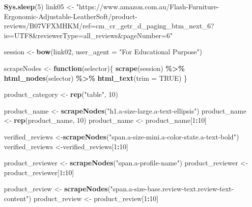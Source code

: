 \documentclass[
]{article}
\newenvironment{Shaded}{\begin{snugshade}}{\end{snugshade}}
\newcommand{\AttributeTok}[1]{\textcolor[rgb]{0.13,0.29,0.53}{#1}}
\newcommand{\ConstantTok}[1]{\textcolor[rgb]{0.56,0.35,0.01}{#1}}
\newcommand{\ControlFlowTok}[1]{\textcolor[rgb]{0.13,0.29,0.53}{\textbf{#1}}}
\newcommand{\DecValTok}[1]{\textcolor[rgb]{0.00,0.00,0.81}{#1}}
\newcommand{\FunctionTok}[1]{\textcolor[rgb]{0.13,0.29,0.53}{\textbf{#1}}}
\newcommand{\NormalTok}[1]{#1}
\newcommand{\OtherTok}[1]{\textcolor[rgb]{0.56,0.35,0.01}{#1}}
\newcommand{\SpecialCharTok}[1]{\textcolor[rgb]{0.81,0.36,0.00}{\textbf{#1}}}
\newcommand{\StringTok}[1]{\textcolor[rgb]{0.31,0.60,0.02}{#1}}
\begin{document}
\begin{Shaded}
\begin{Highlighting}[]
   \FunctionTok{Sys.sleep}\NormalTok{(}\DecValTok{5}\NormalTok{)}
\NormalTok{link05 }\OtherTok{\textless{}{-}} \StringTok{"https://www.amazon.com.au/Flash{-}Furniture{-}Ergonomic{-}Adjustable{-}LeatherSoft/product{-}reviews/B07VFXMHKM/ref=cm\_cr\_getr\_d\_paging\_btm\_next\_6?ie=UTF8\&reviewerType=all\_reviews\&pageNumber=6"}


\NormalTok{  session }\OtherTok{\textless{}{-}} \FunctionTok{bow}\NormalTok{(link02,}
               \AttributeTok{user\_agent =} \StringTok{"For Educational Purpose"}\NormalTok{)}

\NormalTok{  scrapeNodes }\OtherTok{\textless{}{-}} \ControlFlowTok{function}\NormalTok{(selector)\{}
    \FunctionTok{scrape}\NormalTok{(session) }\SpecialCharTok{\%\textgreater{}\%}
      \FunctionTok{html\_nodes}\NormalTok{(selector) }\SpecialCharTok{\%\textgreater{}\%}
      \FunctionTok{html\_text}\NormalTok{(}\AttributeTok{trim =} \ConstantTok{TRUE}\NormalTok{)}
\NormalTok{  \}}

\NormalTok{  product\_category }\OtherTok{\textless{}{-}} \FunctionTok{rep}\NormalTok{(}\StringTok{"table"}\NormalTok{, }\DecValTok{10}\NormalTok{)}

\NormalTok{  product\_name }\OtherTok{\textless{}{-}} \FunctionTok{scrapeNodes}\NormalTok{(}\StringTok{"h1.a{-}size{-}large.a{-}text{-}ellipsis"}\NormalTok{)}
\NormalTok{  product\_name }\OtherTok{\textless{}{-}} \FunctionTok{rep}\NormalTok{(product\_name, }\DecValTok{10}\NormalTok{)}
\NormalTok{  product\_name }\OtherTok{\textless{}{-}}\NormalTok{ product\_name[}\DecValTok{1}\SpecialCharTok{:}\DecValTok{10}\NormalTok{]}
  
\NormalTok{  verified\_reviews }\OtherTok{\textless{}{-}}\FunctionTok{scrapeNodes}\NormalTok{(}\StringTok{"span.a{-}size{-}mini.a{-}color{-}state.a{-}text{-}bold"}\NormalTok{)}
\NormalTok{  verified\_reviews }\OtherTok{\textless{}{-}}\NormalTok{verified\_reviews[}\DecValTok{1}\SpecialCharTok{:}\DecValTok{10}\NormalTok{]}
  
\NormalTok{  product\_reviewer }\OtherTok{\textless{}{-}} \FunctionTok{scrapeNodes}\NormalTok{(}\StringTok{"span.a{-}profile{-}name"}\NormalTok{)}
\NormalTok{  product\_reviewer }\OtherTok{\textless{}{-}}\NormalTok{ product\_reviewer[}\DecValTok{1}\SpecialCharTok{:}\DecValTok{10}\NormalTok{]}
  
\NormalTok{  product\_review }\OtherTok{\textless{}{-}} \FunctionTok{scrapeNodes}\NormalTok{(}\StringTok{"span.a{-}size{-}base.review{-}text.review{-}text{-}content"}\NormalTok{)}
\NormalTok{  product\_review }\OtherTok{\textless{}{-}}\NormalTok{ product\_review[}\DecValTok{1}\SpecialCharTok{:}\DecValTok{10}\NormalTok{]}
  

\end{Highlighting}
\end{Shaded}
\end{document}
